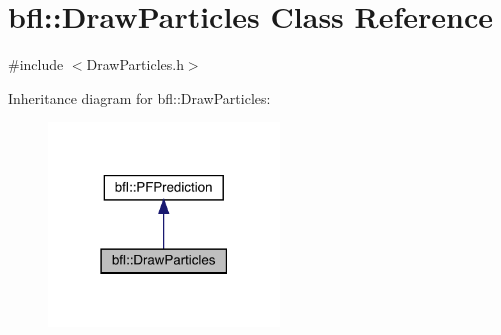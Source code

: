 \hypertarget{classbfl_1_1DrawParticles}{}\section{bfl\+:\+:Draw\+Particles Class Reference}
\label{classbfl_1_1DrawParticles}


{\ttfamily \#include $<$Draw\+Particles.\+h$>$}



Inheritance diagram for bfl\+:\+:Draw\+Particles\+:
\nopagebreak
\begin{figure}[H]
\begin{center}
\leavevmode
\includegraphics[width=174pt]{classbfl_1_1DrawParticles__inherit__graph}
\end{center}
\end{figure}
